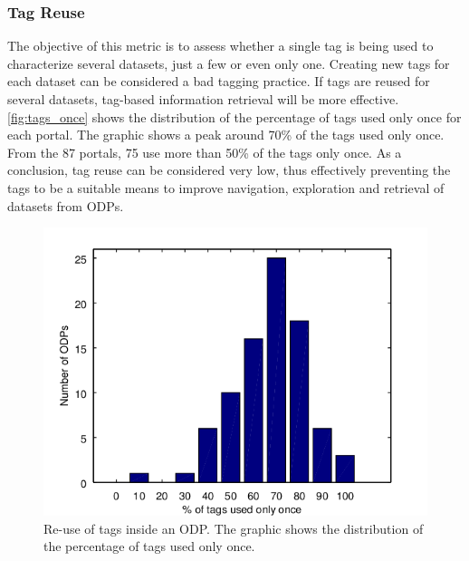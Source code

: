 \subsubsection{Tag Reuse}
The objective of this metric is to assess whether a single tag is being used to characterize several datasets, just a few or even only one.
Creating new tags for each dataset can be considered a bad tagging practice.
If tags are reused for several datasets, tag-based information retrieval will be more effective.
\autoref{fig:tags_once} shows the distribution of the percentage of tags used only once for each portal. 
The graphic shows a peak around 70\% of the tags used only once.
From the 87 portals, 75 use more than 50\% of the tags only once.
As a conclusion, tag reuse can be considered very low, thus effectively preventing the tags to be a suitable means to improve navigation, exploration and retrieval of datasets from ODPs.


\begin{figure}[tb]
\begin{center}
\includegraphics[width=\columnwidth]{images/tag_once_dist.png}
\caption[Re-use of tags inside an ODP.]{Re-use of tags inside an ODP. The graphic shows the distribution of the percentage of tags used only once.}
\label{fig:tags_once}
\end{center}
\end{figure}

